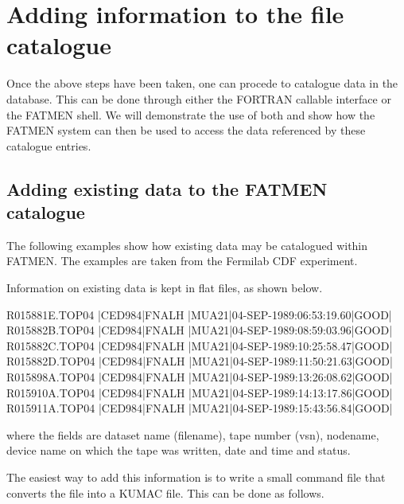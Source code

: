 \section{Adding information to the file catalogue}
\par
Once the above steps have been taken, one can procede to catalogue
data in the database.
This can be done through either the FORTRAN callable interface
or the FATMEN shell. We will demonstrate the use of both and show
how the FATMEN system can then be used to access the data referenced
by these catalogue entries.
\subsection{Adding existing data to the FATMEN catalogue}
\par
The following examples show how existing data may be catalogued
within FATMEN. The examples are taken from the Fermilab CDF 
experiment.
\par
Information on existing data is kept in flat files, as shown below.
\begin{XMP}
R015881E.TOP04   |CED984|FNALH   |MUA21|04-SEP-1989:06:53:19.60|GOOD|
R015882B.TOP04   |CED984|FNALH   |MUA21|04-SEP-1989:08:59:03.96|GOOD|
R015882C.TOP04   |CED984|FNALH   |MUA21|04-SEP-1989:10:25:58.47|GOOD|
R015882D.TOP04   |CED984|FNALH   |MUA21|04-SEP-1989:11:50:21.63|GOOD|
R015898A.TOP04   |CED984|FNALH   |MUA21|04-SEP-1989:13:26:08.62|GOOD|
R015910A.TOP04   |CED984|FNALH   |MUA21|04-SEP-1989:14:13:17.86|GOOD|
R015911A.TOP04   |CED984|FNALH   |MUA21|04-SEP-1989:15:43:56.84|GOOD|
\end{XMP}
where the fields are dataset name (filename), tape number (vsn),
nodename, device name on which the tape was written, date and time
and status.
\par
The easiest way to add this information is to write a small command
file that converts the file into a KUMAC file. This can be done
as follows.
